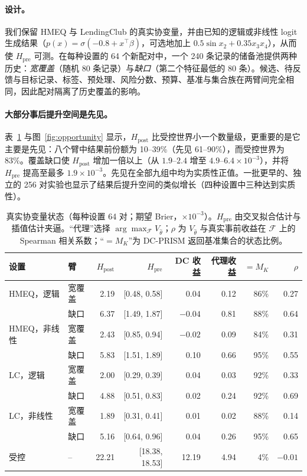 \documentclass[runningheads]{llncs}
\begin{document}
\paragraph{设计。}我们保留 HMEQ 与 LendingClub 的真实协变量，并由已知的逻辑或非线性 logit 生成结果（$p(x)=\sigma(-0.8+x^\top\beta)$，可选地加上 $0.5\sin x_2+0.35x_3x_4$），从而使 $H_{\mathrm{pre}}$ 可测。在每种设置的 64 个新配对中，一个 240 条记录的储备池提供两种历史：\emph{宽覆盖}（随机 80 条记录）与\emph{缺口}（第二个特征最低的 80 条）。候选、待反馈与目标记录、标签、预处理、风险分数、预算、基准与集合族在两臂间完全相同，因此配对隔离了历史覆盖的影响。

\paragraph{大部分事后提升空间是先见。}表~\ref{tab:realx} 与图~\ref{fig:opportunity} 显示，$H_{\mathrm{post}}$ 比受控世界小一个数量级，更重要的是它主要是先见：八个臂中结果前份额为 10--39\%（先见 61--90\%），而受控世界为 83\%。覆盖缺口使 $H_{\mathrm{post}}$ 增加一倍以上（从 $1.9$--$2.4$ 增至 $4.9$--$6.4\times10^{-3}$），并将 $H_{\mathrm{pre}}$ 提高至最多 $1.9\times10^{-3}$。先见在全部九组中均为实质性正值。一批更早的、独立的 256 对实验也显示了结果后提升空间的类似增长（四种设置中三种达到实质性）。

\begin{table}[t]
\caption{真实协变量状态（每种设置 64 对；期望 Brier，$\times10^{-3}$）。$H_{\mathrm{pre}}$ 由交叉拟合估计与插值估计夹逼。“代理”选择 $\arg\max_{\mathcal F}V_{\widehat\theta}$；$\rho$ 为 $V_{\widehat\theta}$ 与真实事前收益在 $\mathcal F$ 上的 Spearman 相关系数；“$=M_K$”为 DC-PRISM 返回基准集合的状态比例。}
\label{tab:realx}
\centering\small
\setlength{\tabcolsep}{2.5pt}
\begin{tabular}{llrrrrrr}
\toprule
设置 & 臂 & $H_{\mathrm{post}}$ & $H_{\mathrm{pre}}$ & DC 收益 & 代理收益 & $=M_K$ & $\rho$ \\
\midrule
HMEQ，逻辑 & 宽覆盖 & 2.19 & [0.48, 0.58] & 0.04 & 0.12 & 86\% & 0.27 \\
 & 缺口 & 6.37 & [1.49, 1.87] & $-0.04$ & 0.81 & 88\% & 0.64 \\
HMEQ，非线性 & 宽覆盖 & 2.43 & [0.85, 0.94] & $-0.02$ & 0.09 & 84\% & 0.31 \\
 & 缺口 & 5.83 & [1.51, 1.89] & 0.10 & 0.66 & 95\% & 0.55 \\
LC，逻辑 & 宽覆盖 & 2.00 & [0.29, 0.39] & 0.04 & 0.03 & 92\% & 0.33 \\
 & 缺口 & 4.88 & [0.51, 0.83] & 0.02 & 0.24 & 92\% & 0.69 \\
LC，非线性 & 宽覆盖 & 1.89 & [0.31, 0.41] & 0.01 & 0.02 & 88\% & 0.14 \\
 & 缺口 & 5.16 & [0.64, 0.96] & 0.04 & 0.26 & 95\% & 0.65 \\
\midrule
受控 & -- & 22.21 & [18.38, 18.53] & 12.19 & 4.94 & 4\% & $-0.01$ \\
\bottomrule
\end{tabular}
\end{table}
\end{document}
